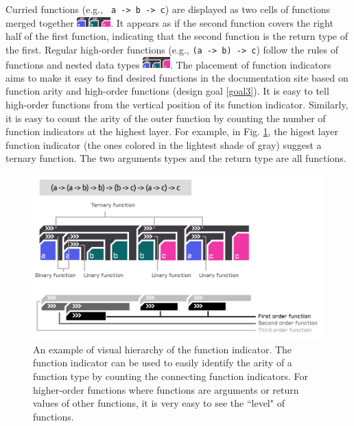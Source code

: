 \documentclass[preprint,12pt]{elsarticle}
\begin{document}
Curried functions (e.g., \texttt{ a -> b -> c}) are displayed as two cells of functions merged together \includegraphics[height=1em]{figures/Curry.png}. It appears as if the second function covers the right half of the first function, indicating that the second function is the return type of the first. Regular high-order functions (e.g., \texttt{(a -> b) -> c}) follow the rules of functions and nested data types \includegraphics[height=1.2em]{figures/HOF.png}. The placement of function indicators aims to make it easy to find desired functions in the documentation site based on function arity and high-order functions (design goal \ref{goal3}). It is easy to tell high-order functions from the vertical position of its function indicator. Similarly, it is easy to count the arity of the outer function by counting the number of function indicators at the highest layer. For example, in Fig. \ref{fig:indicator}, the higest layer function indicator (the ones colored in the lightest shade of gray) suggest a ternary function. The two arguments types and the return type are all functions.

\begin{figure}[h]
  \includegraphics[width=\linewidth]{figures/Indicator}
  \caption{
        \label{fig:indicator}
        An example of visual hierarchy of the function indicator. The function indicator can be used to easily identify the arity of a function type by counting the connecting function indicators. For higher-order functions where functions are arguments or return values of other functions, it is very easy to see the ``level" of functions. 
  }
\end{figure}
\end{document}
